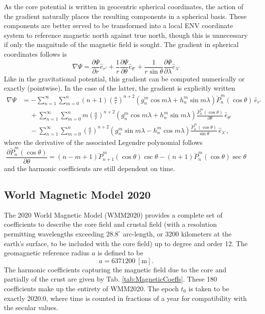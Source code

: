 \documentclass[11pt,dvipsnames]{thesis}
\begin{document}
As the core potential is written in geocentric spherical coordinates, the action of the gradient naturally places the resulting components in a spherical basis. These components are better served to be transformed into a local ENV coordinate system to reference magnetic north against true north, though this is unnecessary if only the magnitude of the magnetic field is sought. The gradient in spherical coordinates follows is
\begin{equation}
\nabla \Psi = \frac{\partial \Psi}{\partial r} \hat{e}_{r'} + \frac{1}{r} \frac{\partial \Psi}{\partial \theta} \hat{e}_{\theta'} + \frac{1}{r \sin\theta} \frac{\partial \Psi}{\partial \lambda} \hat{e}_{\lambda'}
\end{equation}
Like in the gravitational potential, this gradient can be computed numerically or exactly (pointwise). In the case of the latter, the gradient is explicitly written
\begin{align}
\nabla \Psi &= -\sum_{n = 1}^\infty \sum_{m = 0}^n (n+1) \left(\frac{a}{r}\right)^{\!n+2} (g_n^m \cos m\lambda + h_n^m \sin m\lambda) \breve{P}_n^m(\cos\theta) \,\hat{e}_{r'} \\
&\quad\, + \sum_{n = 1}^\infty \sum_{m = 0}^n m\left(\frac{a}{r}\right)^{\!n+2} (g_n^m \cos m\lambda + h_n^m \sin m\lambda) \frac{\breve{P}_n^m(\cos\theta)}{\partial \theta} \,\hat{e}_{\theta'} \\
&\quad\, - \sum_{n = 1}^\infty \sum_{m = 0}^n \left(\frac{a}{r}\right)^{\!n+2} (g_n^m \sin m\lambda - h_n^m \cos m\lambda) \frac{\breve{P}_n^m(\cos\theta)}{\sin\theta} \,\hat{e}_{\lambda'},
\end{align}
where the derivative of the associated Legendre polynomial follows
\begin{equation}
\frac{\partial \breve{P}_n^m(\cos\theta)}{\partial \theta} = (n - m + 1) \breve{P}_{n + 1}^m(\cos\theta) \csc\theta - (n + 1) \breve{P}_n^m(\cos\theta) \sec\theta
\end{equation}
and the harmonic coefficients are still dependent on time.

\subsection{World Magnetic Model 2020}
The 2020 World Magnetic Model (WMM2020) provides a complete set of coefficients to describe the core field and crustal field (with a resolution permitting wavelengths exceeding $28.8^\circ$ arc-length, or 3200 kilometers at the earth's surface, to be included with the core field) up to degree and order 12. The geomagnetic reference radius $a$ is defined to be
\begin{equation}
a = \num{6371200} \ [\si{\m}].
\end{equation}
The harmonic coefficients capturing the magnetic field due to the core and partially of the crust are given by Tab. \ref{tab:MagneticCoeffs}. These 180 coefficients make up the entirety of WMM2020. The epoch $t_0$ is taken to be exactly 2020.0, where time is counted in fractions of a year for compatibility with the secular values.
\end{document}
